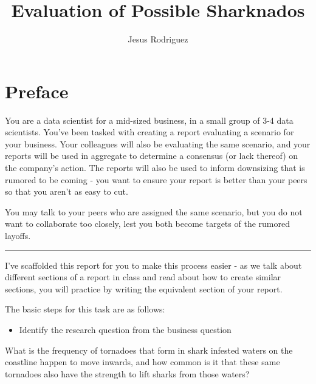 \documentclass[
  letterpaper,
  DIV=11,
  numbers=noendperiod]{scrreprt}
\title{Evaluation of Possible Sharknados}
\author{Jesus Rodriguez}
\date{}
\providecommand{\tightlist}{%
  \setlength{\itemsep}{0pt}\setlength{\parskip}{0pt}}\usepackage{longtable,booktabs,array}
\renewcommand*\contentsname{Table of contents}
\newcommand\contentsname{Table of contents}
\begin{document}
\maketitle

\renewcommand*\contentsname{Table of contents}
{
\hypersetup{linkcolor=}
\setcounter{tocdepth}{2}
\tableofcontents
}

\chapter*{Preface}\label{preface}


You are a data scientist for a mid-sized business, in a small group of
3-4 data scientists. You've been tasked with creating a report
evaluating a scenario for your business. Your colleagues will also be
evaluating the same scenario, and your reports will be used in aggregate
to determine a consensus (or lack thereof) on the company's action. The
reports will also be used to inform downsizing that is rumored to be
coming - you want to ensure your report is better than your peers so
that you aren't as easy to cut.

You may talk to your peers who are assigned the same scenario, but you
do not want to collaborate too closely, lest you both become targets of
the rumored layoffs.

\begin{center}\rule{0.5\linewidth}{0.5pt}\end{center}

I've scaffolded this report for you to make this process easier - as we
talk about different sections of a report in class and read about how to
create similar sections, you will practice by writing the equivalent
section of your report.

The basic steps for this task are as follows:

\begin{itemize}
\tightlist
\item
  Identify the research question from the business question
\end{itemize}

What is the frequency of tornadoes that form in shark infested waters on
the coastline happen to move inwards, and how common is it that these
same tornadoes also have the strength to lift sharks from those waters?
\end{document}
